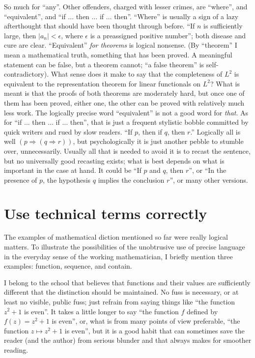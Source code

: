 \documentclass[12pt]{article}
\begin{document}
So much for ``any''. Other offenders, charged with lesser crimes, are ``where'', and ``equivalent'', and ``if $\dots$ then $\dots$ if $\dots$ then''. ``Where'' is usually a sign of a lazy afterthought that should have been thought through before. ``If $n$ is sufficiently large, then $|a_{n}|<\epsilon$, where $\epsilon$ is a preassigned positive number''; both disease and cure are clear. ``Equivalent'' \emph{for theorems} is logical nonsense. (By ``theorem'' I mean a mathematical truth, something that has been proved. A meaningful statement can be false, but a theorem cannot; ``a false theorem'' is self-contradictory). What sense does it make to say that the completeness of $L^{2}$ is equivalent to the representation theorem for linear functionals on $L^{2}$? What is meant is that the proofs of both theorems are moderately hard, but once one of them has been proved, either one, the other can be proved with relatively much less work. The logically precise word ``equivalent'' is not a good word for \emph{that}. As for ``if $\dots$ then $\dots$ if $\dots$ then'', that is just a frequent stylistic bobble committed by quick writers and rued by slow readers. ``If $p$, then if $q$, then $r$.'' Logically all is well $(p\Rightarrow(q\Rightarrow r))$, but psychologically it is just another pebble to stumble over, unnecessarily. Usually all that is needed to avoid it is to recast the sentence, but no universally good recasting exists; what is best depends on what is important in the case at hand. It could be ``If $p$ and $q$, then $r$'', or ``In the presence of $p$, the hypothesis $q$ implies the conclusion $r$'', or many other versions. 

\section{Use technical terms correctly}

The examples of mathematical diction mentioned so far were really logical matters. To illustrate the possibilities of the unobtrusive use of precise language in the everyday sense of the working mathematician, I briefly mention three examples: function, sequence, and contain. 

I belong to the school that believes that functions and their values are sufficiently different that the distinction should be maintained. No fuss is necessary, or at least no visible, public fuss; just refrain from saying things like ``the function $z^{2}+1$ is even''. It takes a little longer to say ``the function $f$ defined by $f(z)=z^{2}+1$ is even'', or, what is from many points of view preferable, ``the function $z \mapsto z^{2}+1$ is even'', but it is a good habit that can sometimes save the reader (and the author) from serious blunder and that always makes for smoother reading. 
\end{document}
